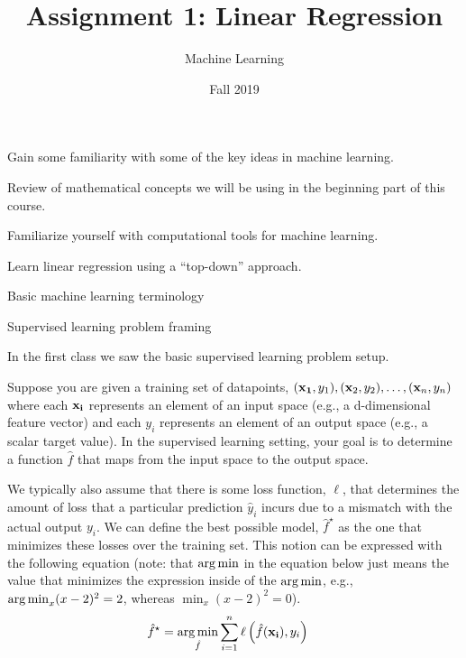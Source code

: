 \documentclass[assignment01_Solutions]{subfiles}
\title{Assignment 1: Linear Regression}
\author{Machine Learning}
\date{Fall 2019}
\begin{document}
\maketitle
\thispagestyle{firstpage}


\begin{learningobjectives}
\bi
\item Gain some familiarity with some of the key ideas in machine learning.
\item Review of mathematical concepts we will be using in the beginning part of this course.
\item Familiarize yourself with computational tools for machine learning.
\item Learn linear regression using a ``top-down'' approach.
\ei
\end{learningobjectives}


\begin{priorknowledge}
\bi
\item Basic machine learning terminology
\item Supervised learning problem framing
\ei
\end{priorknowledge}


\begin{recall}
In the first class we saw the basic supervised learning problem setup.

Suppose you are given a training set of datapoints, $(\mathbf{x_1}, y_1), (\mathbf{x}_2, y_2), \ldots, (\mathbf{x}_n, y_n)$ where each $\mathbf{x_i}$ represents an element of an input space (e.g., a d-dimensional feature vector) and each $y_i$ represents an element of an output space (e.g., a scalar target value).  In the supervised learning setting, your goal is to determine a function $\hat{f}$ that maps from the input space to the output space.

We typically also assume that there is some loss function, $\ell$, that determines the amount of loss that a particular prediction $\hat{y}_i$ incurs due to a mismatch with the actual output $y_i$.  We can define the best possible model, $\hat{f}^\star$ as the one that minimizes these losses over the training set.  This notion can be expressed with the following equation  (note: that $\operatorname*{arg\,min}$ in the equation below just means the value that minimizes the expression inside of the $\operatorname*{arg\,min}$, e.g., $\operatorname*{arg\,min}_{x} (x - 2)^2 = 2$, whereas $\min_{x} (x-2)^2 = 0$).
\begin{align}
\hat{f}^\star &= \operatorname*{arg\,min}_{\hat{f}} \sum_{i=1}^n \ell \left ( \hat{f}(\mathbf{x_i}), y_i \right )
\end{align} 

\end{recall}
\end{document}
